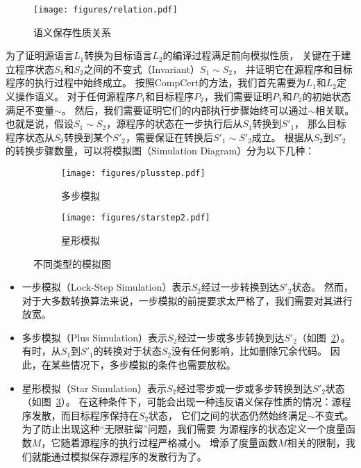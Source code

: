 \begin{figure}[htbp]
    \centering
    \vspace{2ex}
    \texttt{[image: figures/relation.pdf]}
    \caption{语义保存性质关系}\label{fig:relation}
\end{figure}

为了证明源语言$L_1$转换为目标语言$L_2$的编译过程满足前向模拟性质，
关键在于建立程序状态$S_1$和$S_2$之间的不变式（Invariant）$S_1\sim S_2$，
并证明它在源程序和目标程序的执行过程中始终成立。
按照CompCert的方法，我们首先需要为$L_1$和$L_2$定义操作语义。
对于任何源程序$P_1$和目标程序$P_2$，我们需要证明$P_1$和$P_2$的初始状态满足不变量$\sim$。
然后，我们需要证明它们的内部执行步骤始终可以通过$\sim$相关联。
也就是说，假设$S_1\sim S_2$，源程序的状态在一步执行后从$S_1$转换到$S'_1$，
那么目标程序状态从$S_2$转换到某个$S'_2$，需要保证在转换后$S'_1\sim S'_2$成立。
根据从$S_2$到$S'_2$的转换步骤数量，可以将模拟图（Simulation Diagram）分为以下几种：

\begin{figure}[ht]
    \centering
    \begin{subfigure}[b]{0.3\textwidth}
        \texttt{[image: figures/plusstep.pdf]}
        \caption{多步模拟}
        \label{fig:plus}
    \end{subfigure}
    \begin{subfigure}[b]{0.6\textwidth}
        \texttt{[image: figures/starstep2.pdf]}
        \caption{星形模拟}
        \label{fig:star}
    \end{subfigure}
    \caption{不同类型的模拟图}\label{simustep}
\end{figure}

\begin{itemize}
    \item 一步模拟（Lock-Step Simulation）表示$S_2$经过一步转换到达$S'_2$状态。
        然而，对于大多数转换算法来说，一步模拟的前提要求太严格了，我们需要对其进行放宽。
    \item 多步模拟（Plus Simulation）表示$S_2$经过一步或多步转换到达$S'_2$（如图~\ref{fig:plus}）。
        有时，从$S_1$到$S'_1$的转换对于状态$S_2$没有任何影响，比如删除冗余代码。
        因此，在某些情况下，多步模拟的条件也需要放松。
    \item 星形模拟（Star Simulation）表示$S_2$经过零步或一步或多步转换到达$S'_2$状态（如图~\ref{fig:star}）。
        在这种条件下，可能会出现一种违反语义保存性质的情况：源程序发散，而目标程序保持在$S_2$状态，
        它们之间的状态仍然始终满足$\sim$不变式。为了防止出现这种``无限驻留''问题，我们需要
        为源程序的状态定义一个度量函数$M$，它随着源程序的执行过程严格减小。
        增添了度量函数$M$相关的限制，我们就能通过模拟保存源程序的发散行为了。
\end{itemize}

